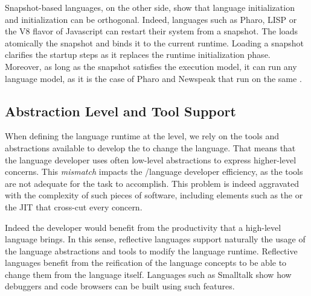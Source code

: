 Snapshot-based languages, on the other side, show that language initialization and \VM initialization can be orthogonal. Indeed, languages such as Pharo, LISP or the V8 flavor of Javascript can restart their system from a snapshot. The \VM loads atomically the snapshot and binds it to the current runtime. Loading a snapshot clarifies the \VM startup steps as it replaces the runtime initialization phase. Moreover, as long as the snapshot satisfies the \VM execution model, it can run any language model, as it is the case of Pharo and Newspeak that run on the same \VM.



\subsection{Abstraction Level and Tool Support}

When defining the language runtime at the \VM level, we rely on the tools and abstractions available to develop the \VM to change the language. That means that the language developer uses often low-level abstractions to express higher-level concerns. This \emph{mismatch} impacts the \VM/language developer efficiency, as the tools are not adequate for the task to accomplish. This problem is indeed aggravated with the complexity of such pieces of software, including elements such as the \GC or the JIT that cross-cut every \VM concern.

Indeed the developer would benefit from the productivity that a high-level language brings. In this sense, reflective languages support naturally the usage of the language abstractions and tools to modify the language runtime. Reflective languages benefit from the reification of the language concepts to be able to change them from the language itself. Languages such as Smalltalk show how debuggers and code browsers can be built using such features.

